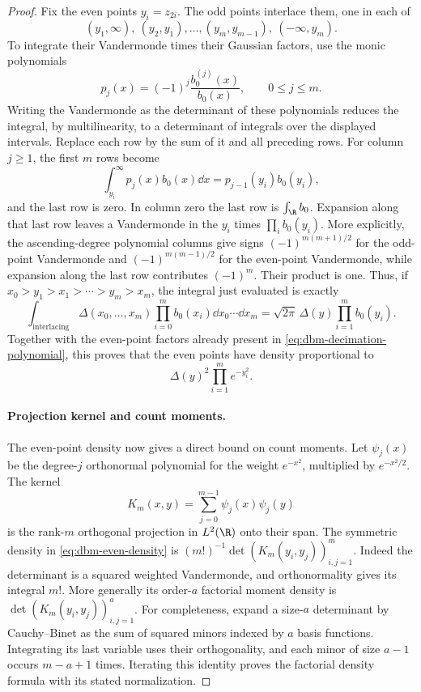 \begin{proof}
Fix the even points \(y_i=z_{2i}\).
The odd points interlace them, one in each of
\[
 (y_1,\infty),\ (y_2,y_1),\ldots,(y_m,y_{m-1}),\
 (-\infty,y_m).
\]
To integrate their Vandermonde times their Gaussian factors, use
the monic polynomials
\[
 p_j(x)=(-1)^j\frac{b_0^{(j)}(x)}{b_0(x)},
 \qquad 0\le j\le m.
\]
Writing the Vandermonde as the determinant of these polynomials
reduces the integral, by multilinearity, to a determinant of
integrals over the displayed intervals. Replace each row by the
sum of it and all preceding rows. For column \(j\ge1\), the first
\(m\) rows become
\[
 \int_{y_i}^\infty p_j(x)b_0(x)\dd x
       =p_{j-1}(y_i)b_0(y_i),
\]
and the last row is zero. In column zero the last row is
\(\int_\R b_0\).
Expansion along that last row leaves a Vandermonde in the \(y_i\)
times \(\prod_i b_0(y_i)\).
More explicitly, the ascending-degree polynomial columns give signs
\((-1)^{m(m+1)/2}\) for the odd-point Vandermonde and
\((-1)^{m(m-1)/2}\) for the even-point Vandermonde, while expansion
along the last row contributes \((-1)^m\). Their product is one.
Thus, if \(x_0>y_1>x_1>\cdots>y_m>x_m\), the integral just evaluated
is exactly
\[
 \int_{\text{interlacing}}
        \Delta(x_0,\ldots,x_m)\prod_{i=0}^m b_0(x_i)
                \dd x_0\cdots\dd x_m
     =\sqrt{2\pi}\,\Delta(y)\prod_{i=1}^m b_0(y_i).
\]
Together with the even-point factors already present in
\eqref{eq:dbm-decimation-polynomial}, this proves that the even
points have density proportional to
\begin{equation}
 \label{eq:dbm-even-density}
 \Delta(y)^2\prod_{i=1}^m e^{-y_i^2}.
\end{equation}

\paragraph{Projection kernel and count moments.}
The even-point density now gives a direct bound on count moments.
Let \(\psi_j(x)\) be the degree-\(j\) orthonormal polynomial for
the weight \(e^{-x^2}\), multiplied by \(e^{-x^2/2}\).
The kernel
\[
 K_m(x,y)=\sum_{j=0}^{m-1}\psi_j(x)\psi_j(y)
\]
is the rank-\(m\) orthogonal projection in \(L^2(\R)\) onto their
span. The symmetric density in \eqref{eq:dbm-even-density} is
\((m!)^{-1}\det(K_m(y_i,y_j))_{i,j=1}^m\).
Indeed the determinant is a squared weighted Vandermonde, and
orthonormality gives its integral \(m!\).
More generally its order-\(a\) factorial moment density is
\(\det(K_m(y_i,y_j))_{i,j=1}^a\).
For completeness, expand a size-\(a\) determinant by Cauchy--Binet
as the sum of squared minors indexed by \(a\) basis functions.
Integrating its last variable uses their orthogonality, and each
minor of size \(a-1\) occurs \(m-a+1\) times. Iterating this identity
proves the factorial density formula with its stated normalization.


\end{proof}
